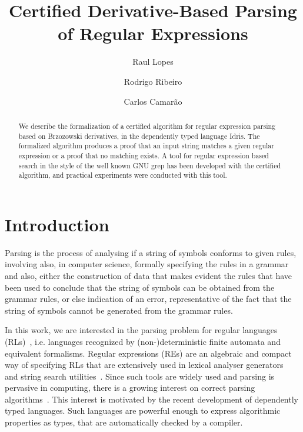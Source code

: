 \documentclass{llncs}
\begin{document}
%
\mainmatter              %

\title{Certified Derivative-Based Parsing of Regular Expressions}

%
\author{Raul Lopes \and Rodrigo Ribeiro  \and Carlos Camar\~ao}
\maketitle              %

\begin{abstract}
We describe the formalization of a certified algorithm for regular
expression parsing based on Brzozowski derivatives, in the dependently
typed language Idris. The formalized algorithm produces a proof that
an input string matches a given regular expression or a proof that no
matching exists. A tool for regular expression based search in the
style of the well known GNU grep has been developed with the certified
algorithm, and practical experiments were conducted with this tool.
\end{abstract}


\section{Introduction}\label{sec:intro}

Parsing is the process of analysing if a string of symbols conforms to
given rules, involving also, in computer science, formally specifying
the rules in a grammar and also, either the construction of data that
makes evident the rules that have been used to conclude that the
string of symbols can be obtained from the grammar rules, or else
indication of an error, representative of the fact that the string of
symbols cannot be generated from the grammar rules.

In this work, we are interested in the parsing problem for regular
languages (RLs)~\cite{Hopcroft2000}, i.e. languages recognized by
(non-)deterministic finite automata and equivalent formalisms. Regular
expressions (REs) are an algebraic and compact way of specifying RLs
that are extensively used in lexical analyser
generators~\cite{Lesk1990} and string search utilities~\cite{Grep}.
Since such tools are widely used and parsing is pervasive in
computing, there is a growing interest on correct parsing
algorithms~\cite{FirsovU13,FirsovU14,Danielsson2010}.  This interest
is motivated by the recent development of dependently typed
languages. Such languages are powerful enough to express algorithmic
properties as types, that are automatically checked by a compiler.
\end{document}
